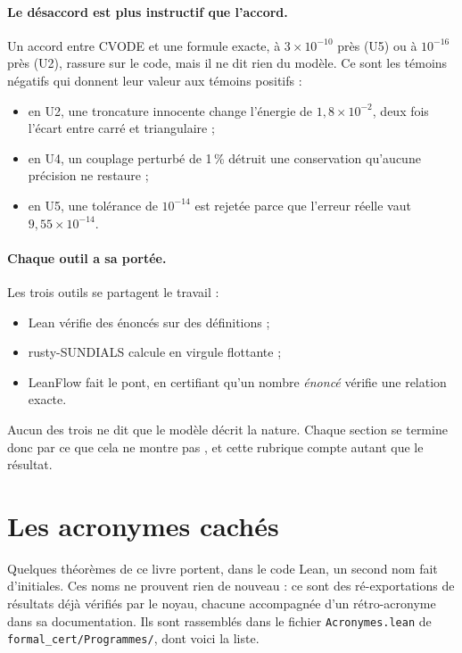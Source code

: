\paragraph{Le désaccord est plus instructif que l'accord.} Un accord entre CVODE et une formule exacte, à
$3\times10^{-10}$ près (U5) ou à $10^{-16}$ près (U2), rassure sur le code, mais il ne dit rien du modèle. Ce sont
les témoins négatifs qui donnent leur valeur aux témoins positifs :
\begin{itemize}
\item en U2, une troncature innocente change l'énergie de $1{,}8\times10^{-2}$, deux fois l'écart entre carré et
triangulaire ;
\item en U4, un couplage perturbé de 1\,\% détruit une conservation qu'aucune précision ne restaure ;
\item en U5, une tolérance de $10^{-14}$ est rejetée parce que l'erreur réelle vaut $9{,}55\times10^{-14}$.
\end{itemize}

\paragraph{Chaque outil a sa portée.} Les trois outils se partagent le travail :
\begin{itemize}
\item Lean vérifie des énoncés sur des définitions ;
\item rusty-SUNDIALS calcule en virgule flottante ;
\item LeanFlow fait le pont, en certifiant qu'un nombre \emph{énoncé} vérifie une relation exacte.
\end{itemize}
Aucun des trois ne dit que le modèle décrit la nature. Chaque section se termine donc par \og ce que cela ne
montre pas \fg{}, et cette rubrique compte autant que le résultat.

\section{Les acronymes cachés}\label{ch5:acronymes}

Quelques théorèmes de ce livre portent, dans le code Lean, un second nom fait d'initiales. Ces noms ne
prouvent rien de nouveau : ce sont des ré-exportations de résultats déjà vérifiés par le noyau, chacune accompagnée
d'un rétro-acronyme dans sa documentation. Ils sont rassemblés dans
le fichier \texttt{Acronymes.lean} de \texttt{formal\_cert/Programmes/}, dont voici la liste.

